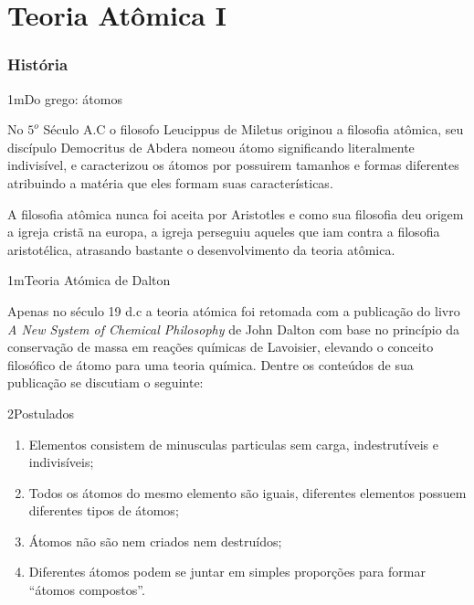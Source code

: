 \part{Teoria Atômica I}

\section*{História}

\begin{sectionBox}1m{Do grego: átomos} %

    No \(5^o\) Século A.C o filosofo Leucippus de Miletus originou a filosofia atômica, seu discípulo Democritus de Abdera nomeou átomo significando literalmente indivisível, e caracterizou os átomos por possuirem tamanhos e formas diferentes atribuindo a matéria que eles formam suas características.

    A filosofia atômica nunca foi aceita por Aristotles e como sua filosofia deu origem a igreja cristã na europa, a igreja perseguiu aqueles que iam contra a filosofia aristotélica, atrasando bastante o desenvolvimento da teoria atômica.

\end{sectionBox}



\begin{sectionBox}1m{Teoria Atómica de Dalton}

    Apenas no século 19 d.c a teoria atómica foi retomada com a publicação do livro \textit{A New System of Chemical Philosophy} de John Dalton com base no princípio da conservação de massa em reações químicas de Lavoisier, elevando o conceito filosófico de átomo para uma teoria química. Dentre os conteúdos de sua publicação se discutiam o seguinte:

    \begin{sectionBox}2{Postulados}

        \begin{enumerate}
            \item Elementos consistem de minusculas particulas sem carga, indestrutíveis e indivisíveis;
            \item Todos os átomos do mesmo elemento são iguais, diferentes elementos possuem diferentes tipos de átomos;
            \item Átomos não são nem criados nem destruídos;
            \item Diferentes átomos podem se juntar em simples proporções para formar ``átomos compostos''.
        \end{enumerate}

    \end{sectionBox}

\end{sectionBox}


